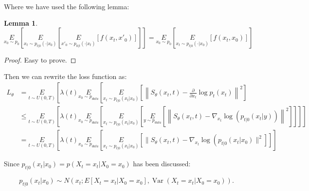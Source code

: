 \documentclass{article}
\newtheorem{proof}{Proof}
\newtheorem{lemma}{Lemma}
\begin{document}
Where we have used the following lemma:
\begin{lemma}
    \begin{equation}
        \underset{x_0\sim p_0}{E}\left[\underset{x_t\sim p_{t|0}(\cdot|x_0)}{E}\left[\underset{x'_0\sim p_{0|t}(\cdot|x_t)}{E}\left[f(x_t, x'_0)\right]\right]\right]=\underset{x_0\sim p_0}{E}\left[\underset{x_t\sim p_{t|0}(\cdot|x_0)}{E}\left[f(x_t, x_0)\right]\right]
    \end{equation}
\end{lemma}
\begin{proof}
    Easy to prove.
\end{proof}
Then we can rewrite the loss function as:
\begin{equation}
    \begin{aligned}
        L_{\theta}&=\underset{t\sim U(0,T)}{E}\left[\lambda(t) \underset{x_{0}\sim p_{data}}{E}\left[\underset{x_{t}\sim p_{t|0}(x_t|x_0)}{E}\left[\left\|S_{\theta}\left(x_{t}, t\right)-\frac{\partial}{\partial x_{t}} \log p_{t}\left(x_{t}\right)\right\|^{2}\right]\right.\right.\\ 
        &\leqslant \underset{t\sim U(0,T)}{E}\left[\lambda(t) \underset{x_{0}\sim p_{data}}{E}\left[\underset{x_{t}\sim p_{t|0}(x_t|x_0)}{E}\left[\underset{y\sim p_{data}}{E}\left[\left\|S_{\theta}\left(x_{t}, t\right)-\nabla_{x_{t}} \log \left(p_{t|0}(x_t | y)\right)\right\|^{2}\right]\right]\right]\right] \\
        &=\underset{t\sim U(0, T)}{E}\left[\lambda(t) \underset{x_{0}\sim p_{data}}{E}\left[\underset{x_{t}\sim p_{t|0}(x_t|x_0)}{E}\left[\| S_{\theta}\left(x_{t}, t\right)-\nabla_{x_{t}} \log \left(p_{t|0}\left(x_{t} | x_{0}\right) \|^{2}\right]\right]\right]\right.
    \end{aligned}
\end{equation}


Since  $p_{t|0}\left(x_{t} | x_{0}\right)=p\left(X_{t}=x_{t} | X_{0}=x_{0}\right)$  has been discussed:

$$p_{t | 0}\left(x_{t} | x_{0}\right) \sim N\left(x_{t} ; E\left[X_{t}=x_t | X_{0}=x_{0}\right], \operatorname{Var}\left(X_{t}=x_t | X_{0}=x_{0}\right)\right) .$$
\end{document}
